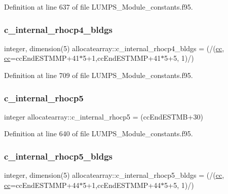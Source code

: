 Definition at line 637 of file L\+U\+M\+P\+S\+\_\+\+Module\+\_\+constants.\+f95.

\mbox{\label{namespaceallocatearray_a089e481a4c0e27082406ebae70f79099}} 
\subsubsection{\texorpdfstring{c\+\_\+internal\+\_\+rhocp4\+\_\+bldgs}{c\_internal\_rhocp4\_bldgs}}
{\footnotesize\ttfamily integer, dimension(5) allocatearray\+::c\+\_\+internal\+\_\+rhocp4\+\_\+bldgs = (/(\hyperlink{namespaceallocatearray_ac863c81704eb507dee10f5e10741e10c}{cc}, \hyperlink{namespaceallocatearray_ac863c81704eb507dee10f5e10741e10c}{cc}=cc\+End\+E\+S\+T\+M\+MP+41$\ast$5+1,cc\+End\+E\+S\+T\+M\+MP+41$\ast$5+5, 1)/)}



Definition at line 709 of file L\+U\+M\+P\+S\+\_\+\+Module\+\_\+constants.\+f95.

\mbox{\label{namespaceallocatearray_a00074a8f0a1de06747dd7c674cea09a6}} 
\subsubsection{\texorpdfstring{c\+\_\+internal\+\_\+rhocp5}{c\_internal\_rhocp5}}
{\footnotesize\ttfamily integer allocatearray\+::c\+\_\+internal\+\_\+rhocp5 = (cc\+End\+E\+S\+T\+MB+30)}



Definition at line 640 of file L\+U\+M\+P\+S\+\_\+\+Module\+\_\+constants.\+f95.

\mbox{\label{namespaceallocatearray_a910f0bcc144af81c13e0a44c1ed408fb}} 
\subsubsection{\texorpdfstring{c\+\_\+internal\+\_\+rhocp5\+\_\+bldgs}{c\_internal\_rhocp5\_bldgs}}
{\footnotesize\ttfamily integer, dimension(5) allocatearray\+::c\+\_\+internal\+\_\+rhocp5\+\_\+bldgs = (/(\hyperlink{namespaceallocatearray_ac863c81704eb507dee10f5e10741e10c}{cc}, \hyperlink{namespaceallocatearray_ac863c81704eb507dee10f5e10741e10c}{cc}=cc\+End\+E\+S\+T\+M\+MP+44$\ast$5+1,cc\+End\+E\+S\+T\+M\+MP+44$\ast$5+5, 1)/)}



